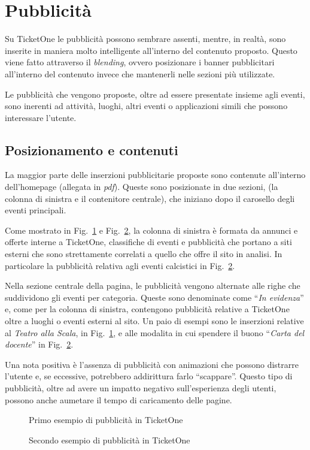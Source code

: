 \section{Pubblicità}\label{pubblicita}

Su TicketOne le pubblicità possono sembrare assenti, mentre,  in realtà, sono inserite in maniera molto intelligente all'interno del contenuto proposto.
Questo viene fatto attraverso il \textit{blending}, ovvero posizionare i banner pubblicitari all'interno del contenuto invece che mantenerli nelle sezioni più utilizzate.
\par Le pubblicità che vengono proposte, oltre ad essere presentate insieme agli eventi, sono inerenti ad attività, luoghi, altri eventi o applicazioni simili che possono interessare l'utente.

\subsection{Posizionamento e contenuti}
	La maggior parte delle inserzioni pubblicitarie proposte sono contenute all'interno dell'homepage (allegata in \textit{pdf}).
	Queste sono posizionate in due sezioni, (la colonna di sinistra e il contenitore centrale), che iniziano dopo il carosello degli eventi principali.
	\par Come mostrato in Fig.~\ref{fig:pub1} e Fig.~\ref{fig:pub2}, la colonna di sinistra è formata da annunci e offerte interne a TicketOne, classifiche di eventi e pubblicità che portano a siti esterni che sono strettamente correlati a quello che offre il sito in analisi.
	In particolare la pubblicità relativa agli eventi calcistici in Fig.~\ref{fig:pub2}.
	\par Nella sezione centrale della pagina, le pubblicità vengono alternate alle righe che suddividono gli eventi per categoria.
	Queste sono denominate come ``\textit{In evidenza}'' e, come per la colonna di sinistra, contengono pubblicità relative a TicketOne oltre a luoghi o eventi esterni al sito.
	Un paio di esempi sono le inserzioni relative al \textit{Teatro alla Scala}, in Fig.~\ref{fig:pub1}, e alle modalita in cui spendere il buono ``\textit{Carta del docente}'' in Fig.~\ref{fig:pub2}.
	\par Una nota positiva è l'assenza di pubblicità con animazioni che possono distrarre l'utente e, se eccessive, potrebbero addirittura farlo ``scappare''.
	Questo tipo di pubblicità, oltre ad avere un impatto negativo sull'esperienza degli utenti, possono anche aumetare il tempo di caricamento delle pagine.

\begin{figure}
	\caption{Primo esempio di pubblicità in TicketOne}
	\label{fig:pub1}
\end{figure}

\begin{figure}
	\caption{Secondo esempio di pubblicità in TicketOne}
	\label{fig:pub2}
\end{figure}